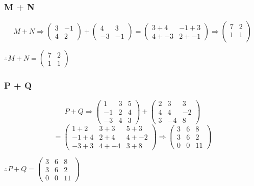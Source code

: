 \documentclass{article}
\begin{document}
\subsubsection{M + N}
\[
M + N \Rightarrow
	\begin{pmatrix}
		3 & -1\\
		4 & 2
	\end{pmatrix}
	+
	\begin{pmatrix}
		4 & 3\\
		-3 & -1
	\end{pmatrix}
	=
	\begin{pmatrix}
		3+4 & -1+3\\
		4+-3 & 2+-1
	\end{pmatrix}
	\Rightarrow
	\begin{pmatrix}
		7 & 2\\
		1 & 1\\
	\end{pmatrix}
\]
\begin{center}\vspace{0.5cm}$\therefore M+N=\begin{pmatrix} 7 & 2\\ 1 & 1\end{pmatrix}$\end{center}

\subsubsection{P + Q}
\[
P + Q \Rightarrow
	\begin{pmatrix}
		1 & 3 & 5\\
		-1 & 2 & 4\\
		-3 & 4 & 3
	\end{pmatrix}
	+
	\begin{pmatrix}
		2 & 3 & 3\\
		4 & 4 & -2\\
		3 & -4 & 8
	\end{pmatrix}
\]
\[
	=
	\begin{pmatrix}
		1+2 & 3+3 & 5+3\\
		-1+4 & 2+4 & 4+-2\\
		-3+3 & 4+-4 & 3+8
	\end{pmatrix}
	\Rightarrow
	\begin{pmatrix}
		3 & 6 & 8\\
		3 & 6 & 2\\
		0 & 0 & 11 
	\end{pmatrix}
\]
\begin{center}\vspace{0.5cm}$\therefore P+Q=\begin{pmatrix} 3 & 6 & 8\\3 & 6 & 2\\0 & 0 & 11\end{pmatrix}$\end{center}
\end{document}

